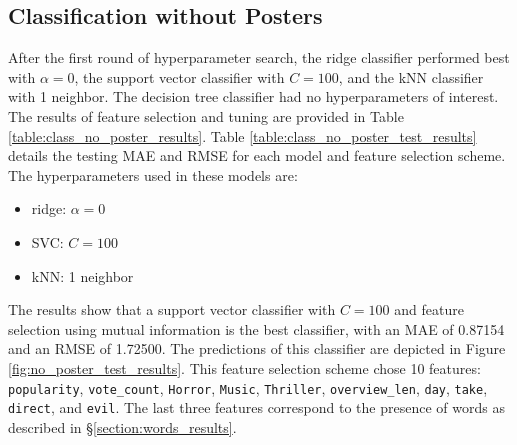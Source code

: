 \documentclass[12pt, oneside]{article}   	%
\begin{document}
\subsection{Classification without Posters}
\label{section:class_no_posters_results}

After the first round of hyperparameter search, the ridge classifier performed best with $\alpha=0$, the support vector classifier with $C=100$, and the kNN classifier with 1 neighbor. The decision tree classifier had no hyperparameters of interest. The results of feature selection and tuning are provided in Table \ref{table:class_no_poster_results}. Table \ref{table:class_no_poster_test_results} details the testing MAE and RMSE for each model and feature selection scheme. The hyperparameters used in these models are:
\begin{itemize}
\item ridge: $\alpha=0$
\item SVC: $C=100$
\item kNN: 1 neighbor
\end{itemize}
The results show that a support vector classifier with $C=100$ and feature selection using mutual information is the best classifier, with an MAE of 0.87154 and an RMSE of 1.72500. The predictions of this classifier are depicted in Figure \ref{fig:no_poster_test_results}. This feature selection scheme chose 10 features: \texttt{popularity}, \texttt{vote\_count}, \texttt{Horror}, \texttt{Music}, \texttt{Thriller}, \texttt{overview\_len}, \texttt{day}, \texttt{take}, \texttt{direct}, and \texttt{evil}. The last three features correspond to the presence of words as described in \S \ref{section:words_results}.

\begin{table}
\caption{\label{table:class_no_poster_results}Results of feature selection and hyperparameter tuning without posters.}
\end{table}
\end{document}
